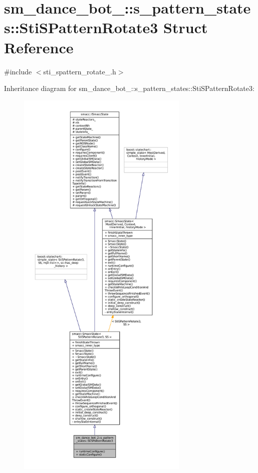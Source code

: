 \hypertarget{structsm__dance__bot__2_1_1s__pattern__states_1_1StiSPatternRotate3}{}\section{sm\+\_\+dance\+\_\+bot\+\_\+:\+:s\+\_\+pattern\+\_\+states\+:\+:Sti\+S\+Pattern\+Rotate3 Struct Reference}
\label{structsm__dance__bot__2_1_1s__pattern__states_1_1StiSPatternRotate3}


{\ttfamily \#include $<$sti\+\_\+spattern\+\_\+rotate\+\_.\+h$>$}



Inheritance diagram for sm\+\_\+dance\+\_\+bot\+\_\+:\+:s\+\_\+pattern\+\_\+states\+:\+:Sti\+S\+Pattern\+Rotate3\+:
\nopagebreak
\begin{figure}[H]
\begin{center}
\leavevmode
\includegraphics[height=550pt]{structsm__dance__bot__2_1_1s__pattern__states_1_1StiSPatternRotate3__inherit__graph}
\end{center}
\end{figure}


